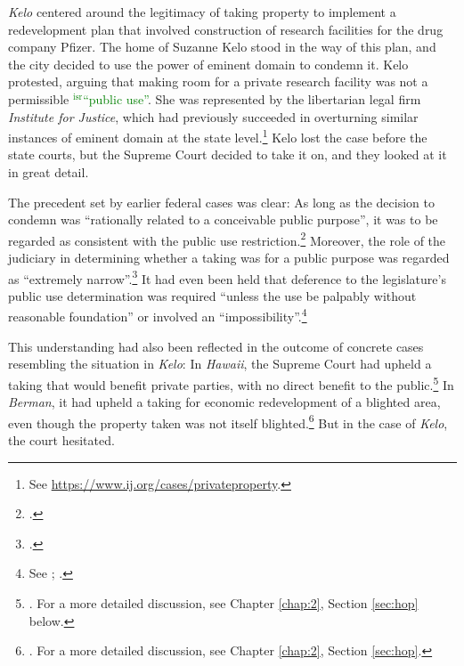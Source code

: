 \documentclass[12pt,a4paper]{book} %
\newcommand{\isr}[1]{\textcolor{green}{$^{\textrm{isr}}${#1}}}
\begin{document}
{\it Kelo} centered around the legitimacy of taking property to implement a redevelopment plan that involved construction of research facilities for the drug company Pfizer. The home of Suzanne Kelo stood in the way of this plan, and the city decided to use the power of eminent domain to condemn it. Kelo protested, arguing that making room for a private research facility was not a permissible  \isr{``public use''}. She was represented by the libertarian legal firm {\it Institute for Justice}, which had previously succeeded in overturning similar instances of eminent domain at the state level.\footnote{See \url{https://www.ij.org/cases/privateproperty}.} Kelo lost the case before the state courts, but the Supreme Court decided to take it on, and they looked at it in great detail.

The precedent set by earlier federal cases was clear: As long as the decision to condemn was ``rationally related to a conceivable public purpose'', it was to be regarded as consistent with the public use restriction.\footcite[241]{midkiff84} Moreover, the role of the judiciary in determining whether a taking was for a public purpose was regarded as ``extremely narrow''.\footcite[32]{berman54} It had even been held that deference to the legislature's public use determination was required ``unless the use be palpably without reasonable foundation'' or involved an ``impossibility''.\footnote{See \cite[66]{dominion25}; \cite[680]{gettysburg96}.}

This understanding had also been reflected in the outcome of concrete cases resembling the situation in {\it Kelo}: In {\it Hawaii}, the Supreme Court had upheld a taking that would benefit private parties, with no direct benefit to the public.\footnote{\cite{midkiff84}. For a more detailed discussion, see Chapter \ref{chap:2}, Section \ref{sec:hop} below.} In {\it Berman}, it had upheld a taking for economic redevelopment of a blighted area, even though the property taken was not itself blighted.\footnote{\cite{berman54}. For a more detailed discussion, see Chapter \ref{chap:2}, Section \ref{sec:hop}.} But in the case of {\it Kelo}, the court hesitated.
\end{document}
